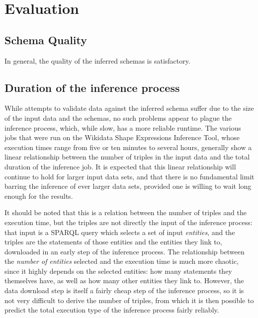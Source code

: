 
\chapter{Evaluation}
\label{ch:Evaluation}

\section{Schema Quality}
\label{sec:Evaluation:quality}

In general, the quality of the inferred schemas is satisfactory.

\section{Duration of the inference process}
\label{sec:Evaluation:duration}

While attempts to validate data against the inferred schema
suffer due to the size of the input data and the schemas,
no such problems appear to plague the inference process,
which, while slow, has a more reliable runtime.
The various jobs that were run on the Wikidata Shape Expressions Inference Tool,
whose execution times range from five or ten minutes to several hours,
generally show a linear relationship between the number of triples in the input data
and the total duration of the inference job.
It is expected that this linear relationship will continue to hold for larger input data sets,
and that there is no fundamental limit barring the inference of ever larger data sets,
provided one is willing to wait long enough for the results.

It should be noted %
that this is a relation between the number of triples and the execution time,
but the triples are not directly the input of the inference process:
that input is a SPARQL query which selects a set of input \emph{entities},
and the triples are the statements of those entities and the entities they link to,
downloaded in an early step of the inference process.
The relationship between the \emph{number of entities} selected and the execution time
is much more chaotic, %
since it highly depends on the selected entities:
how many statements they themselves have,
as well as how many other entities they link to.
However, the data download step is itself a fairly cheap %
step of the inference process,
so it is not very difficult to derive the number of triples,
from which it is then possible to predict the total execution type of the inference process fairly reliably.

